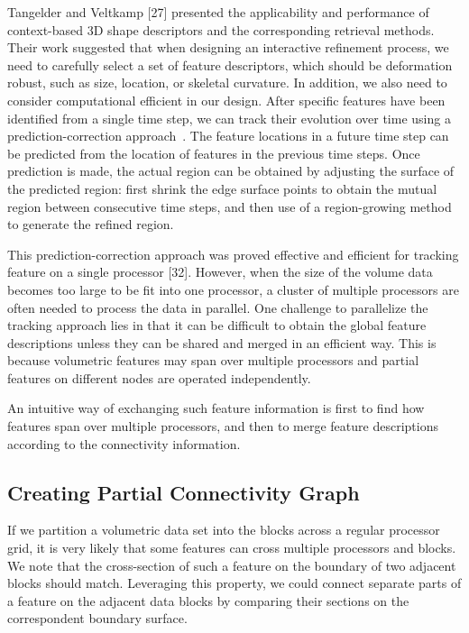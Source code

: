 \documentclass[10pt, conference, compsocconf]{IEEEtran}
\begin{document}
Tangelder and Veltkamp [27] presented the applicability and performance of context-based 3D shape descriptors and the corresponding retrieval methods. Their work suggested that when designing an interactive refinement process, we need to carefully select a set of feature descriptors, which should be deformation robust, such as size, location, or skeletal curvature. In addition, we also need to consider computational efficient in our design. 
After specific features have been identified from a single time step, we can track their evolution over time using a prediction-correction approach~\cite{}. The feature locations in a future time step can be predicted from the location of features in the previous time steps. Once prediction is made, the actual region can be obtained by adjusting the surface of the predicted region: first shrink the edge surface points to obtain the mutual region between consecutive time steps, and then use of a region-growing method to generate the refined region.

This prediction-correction approach was proved effective and efficient for tracking feature on a single processor [32]. However, when the size of the volume data becomes too large to be fit into one processor, a cluster of multiple processors are often needed to process the data in parallel. One challenge to parallelize the tracking approach lies in that it can be difficult to obtain the global feature descriptions unless they can be shared and merged in an efficient way. This is because volumetric features may span over multiple processors and partial features on different nodes are operated independently.

An intuitive way of exchanging such feature information is first to find how features span over multiple processors, and then to merge feature descriptions according to the connectivity information.

\subsection{Creating Partial Connectivity Graph}
If we partition a volumetric data set into the blocks across a regular processor grid, it is very likely that some features can cross multiple processors and blocks. We note that the cross-section of such a feature on the boundary of two adjacent blocks should match. Leveraging this property, we could connect separate parts of a feature on the adjacent data blocks by comparing their sections on the correspondent boundary surface.
\end{document}
